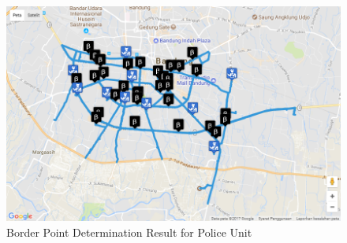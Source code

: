 \begin{figure}[H]
    \centering
    \includegraphics[scale=0.6]{v_border_point_pol.png}
    \caption{Border Point Determination Result for Police Unit}
    \label{fig:bp_pol}
\end{figure}

